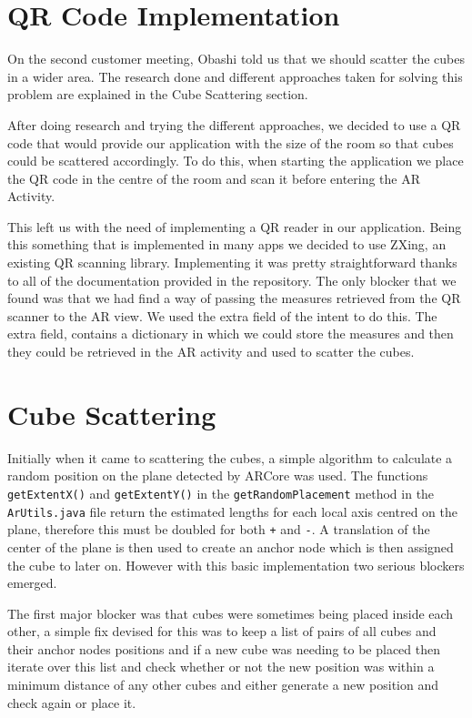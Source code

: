 \documentclass{l3proj}
\begin{document}
\section{QR Code Implementation}
On the second customer meeting, Obashi told us that we should scatter the
cubes in a wider area. The research done and different approaches taken
for solving this problem are explained in the Cube Scattering section. %

After doing research and trying the different approaches, we decided to
use a QR code that would provide our application with the size of
the room so that cubes could be scattered accordingly. To do this,
when starting the application we place the QR code in the centre of
the room and scan it before entering the AR Activity.

This left us with the need of implementing a QR reader in our application.
Being this something that is implemented in many apps we decided to use
ZXing\cite{ZXing}, an existing QR scanning library. Implementing it was
pretty straightforward thanks to all of the documentation provided in
the repository. The only blocker that we found was that we had find a
way of passing the measures retrieved from the QR scanner to the AR view.
We used the extra field of the intent to do this. The extra field,
contains a dictionary in which we could store the measures and then
they could be retrieved in the AR activity and used to scatter the
cubes.

\section{Cube Scattering}

Initially when it came to scattering the cubes, a simple algorithm to calculate a random position 
on the plane detected by ARCore was used. The functions \verb|getExtentX()| and \verb|getExtentY()| 
in the \verb|getRandomPlacement| method in the \verb|ArUtils.java| file return the estimated 
lengths for each local axis centred on the plane, therefore this must be doubled for both \verb|+| 
and \verb|-|. A translation of the center of the plane is then used to create an anchor node which 
is then assigned the cube to later on. However with this basic implementation two serious blockers 
emerged.

The first major blocker was that cubes were sometimes being placed inside each other, a simple fix 
devised for this was to keep a list of pairs of all cubes and their anchor nodes positions and if 
a new cube was needing to be placed then iterate over this list and check whether or not the new 
position was within a minimum distance of any other cubes and either generate a new position and 
check again or place it.
\end{document}
